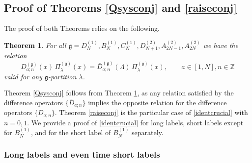 \documentclass[12pt]{amsart}
\newtheorem{thm}{Theorem}[section]
\newcommand{\barD}{\bar D}
\newcommand{\g}{{\mathfrak{g}}}
\newcommand{\Z}{{\mathbb Z}}
\newcommand{\lL}{{\Lambda}}
\newcommand{\half}{\frac{1}{2}}
\numberwithin{equation}{section}
\begin{document}
%



\subsection{Proof of  Theorems \ref{Qsysconj} and \ref{raiseconj}}\label{sec:43}
%
%
%
%
%
The proof of both Theorems relies on the following.
\begin{thm} \label{foutranthm}
For all $\g=D_N^{(1)},B_N^{(1)},C_N^{(1)},D_{N+1}^{(2)},A_{2N-1}^{(2)},A_{2N}^{(2)}$ we have the relation
\begin{equation}\label{identcrucial}
D_{a;n}^{(\g)}(x)\,\Pi_\lambda^{(\g)}(x)=\barD_{a;n}^{(\g)}(\lL)\,\Pi_\lambda^{(\g)}(x),\qquad a\in[1,N], n\in\Z
\end{equation}
valid for any $\g$-partition $\lambda$.
%
\end{thm}
Theorem \ref{Qsysconj} follows from Theorem \ref{foutranthm}, as any relation satisfied by the difference operators $\{\barD_{a;n}\}$ implies the opposite relation for the difference operators $\{ D_{a;n}\}$. Theorem \ref{raiseconj} is the
particular case of \eqref{identcrucial} with $n=0,1$. We provide a proof of  \eqref{identcrucial} for long labels, short labels except for $B_N^{(1)}$,
and for the short label of $B_N^{(1)}$ separately.

\subsubsection{Long labels and even time short labels}
\end{document}
